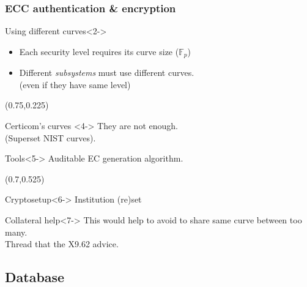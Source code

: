 \documentclass{beamer}
\newcommand{\Fp}{\ensuremath{\mathbb{F}_p}}%
\begin{document}
\begin{frame}
\frametitle{ECC authentication \& encryption}
    \begin{block}{Using different curves}<2->
        \begin{itemize}
            \item<2-> Each security level requires its curve size (\Fp)
            \item<3-> Different \emph{subsystems} must use different curves.\\(even if they have same level)
        \end{itemize}
    \end{block}
    \begin{textblock*}{40mm}(0.75\textwidth,0.225\textheight)
        \begin{exampleblock}{Certicom's curves \cite{sec2}}<4->
            They are not enough.\\\small{(Superset NIST curves).}
        \end{exampleblock}
    \end{textblock*}
    \begin{alertblock}{Tools}<5->
        Auditable EC generation algorithm.
    \end{alertblock}
    \begin{textblock*}{45mm}(0.7\textwidth,0.525\textheight)
        \begin{exampleblock}{Cryptosetup}<6->
            Institution (re)set
        \end{exampleblock}
    \end{textblock*}
    \begin{exampleblock}{Collateral help}<7->
        This would help to avoid to share same curve between too many.\\Thread that the X9.62 \cite{X9.62-1998} advice.
    \end{exampleblock}
\end{frame}

\subsection{Database}
\end{document}
